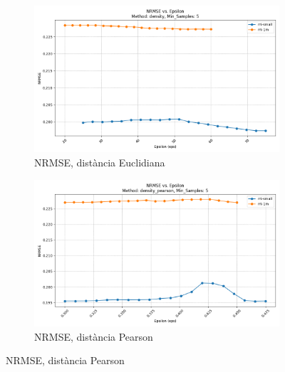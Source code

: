 \documentclass[a4paper,12pt]{report}
\begin{document}
\begin{figure}[H]
    \begin{subfigure}[b]{0.49\textwidth}
        \includegraphics[width=\textwidth]{Figuras/DBSCAN/res/ml-small_ml-1m_density_nrmse_vs_eps.png}
        \caption{NRMSE, distància Euclidiana}
        \label{fig:dbscan-clustering-results-c}
    \end{subfigure}
    \hfill
    \begin{subfigure}[b]{0.49\textwidth}
        \includegraphics[width=\textwidth]{Figuras/DBSCAN/res/ml-small_ml-1m_density_pearson_nrmse_vs_eps.png}
        \caption{NRMSE, distància Pearson}
        \label{fig:dbscan-clustering-results-d}
    \end{subfigure}

    \vspace{1em}


\end{figure}
\end{document}

